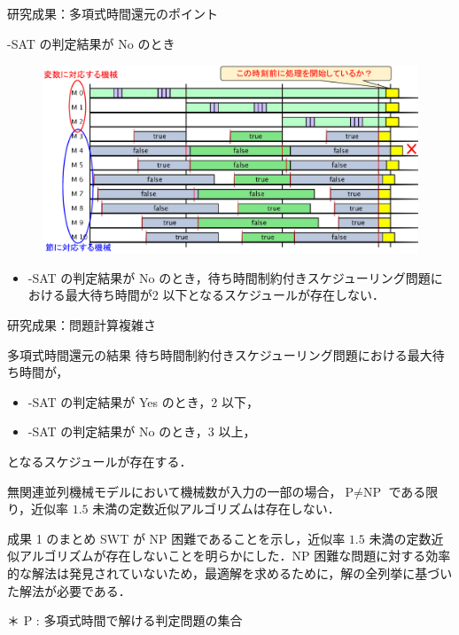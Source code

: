 \documentclass[dvipdfmx]{beamer}
\begin{document}
    \begin{frame}{研究成果：多項式時間還元のポイント}
      \begin{block}{{-SAT} の判定結果が No のとき}
        \begin{figure}[h]
          \centering
          \includegraphics[width=12cm]{figure/reduction2.pdf}
        \end{figure}
      \end{block}
      \begin{itemize}
        \setlength{\leftskip}{-3mm}
        \item {-SAT} の判定結果が \alert{No} のとき，待ち時間制約付きスケジューリング問題における最大待ち時間が\alert{2 以下}となるスケジュールが\alert{存在しない}．
      \end{itemize}
    \end{frame}

    \begin{frame}{研究成果：問題計算複雑さ}
      \begin{block}{多項式時間還元の結果}
        待ち時間制約付きスケジューリング問題における最大待ち時間が，
        \begin{itemize}
          \item {-SAT} の判定結果が \alert{Yes} のとき，\alert{2 以下}，
          \item {-SAT} の判定結果が \alert{No} のとき，\alert{3 以上}，
        \end{itemize}
        となるスケジュールが存在する．
      \end{block}
      無関連並列機械モデルにおいて機械数が入力の一部の場合，$\text{P} \neq \text{NP}$ である限り，近似率 $1.5$ 未満の定数近似アルゴリズムは存在しない．
      \begin{alertblock}{成果 1 のまとめ}
        SWT が NP 困難であることを示し，近似率 $1.5$ 未満の定数近似アルゴリズムが存在しないことを明らかにした．NP 困難な問題に対する効率的な解法は発見されていないため，最適解を求めるために，解の全列挙に基づいた解法が必要である．
      \end{alertblock}
      ＊ P : 多項式時間で解ける判定問題の集合
    \end{frame}
\end{document}
